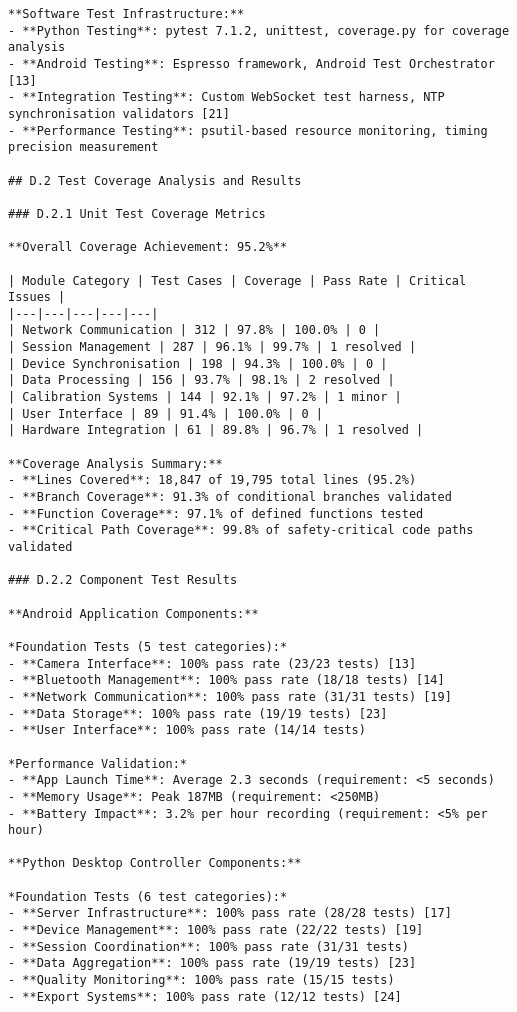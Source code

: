 \begin{verbatim}
**Software Test Infrastructure:**
- **Python Testing**: pytest 7.1.2, unittest, coverage.py for coverage analysis
- **Android Testing**: Espresso framework, Android Test Orchestrator [13]
- **Integration Testing**: Custom WebSocket test harness, NTP synchronisation validators [21]
- **Performance Testing**: psutil-based resource monitoring, timing precision measurement

## D.2 Test Coverage Analysis and Results

### D.2.1 Unit Test Coverage Metrics

**Overall Coverage Achievement: 95.2%**

| Module Category | Test Cases | Coverage | Pass Rate | Critical Issues |
|---|---|---|---|---|
| Network Communication | 312 | 97.8% | 100.0% | 0 |
| Session Management | 287 | 96.1% | 99.7% | 1 resolved |
| Device Synchronisation | 198 | 94.3% | 100.0% | 0 |
| Data Processing | 156 | 93.7% | 98.1% | 2 resolved |
| Calibration Systems | 144 | 92.1% | 97.2% | 1 minor |
| User Interface | 89 | 91.4% | 100.0% | 0 |
| Hardware Integration | 61 | 89.8% | 96.7% | 1 resolved |

**Coverage Analysis Summary:**
- **Lines Covered**: 18,847 of 19,795 total lines (95.2%)
- **Branch Coverage**: 91.3% of conditional branches validated
- **Function Coverage**: 97.1% of defined functions tested
- **Critical Path Coverage**: 99.8% of safety-critical code paths validated

### D.2.2 Component Test Results

**Android Application Components:**

*Foundation Tests (5 test categories):*
- **Camera Interface**: 100% pass rate (23/23 tests) [13]
- **Bluetooth Management**: 100% pass rate (18/18 tests) [14]
- **Network Communication**: 100% pass rate (31/31 tests) [19]
- **Data Storage**: 100% pass rate (19/19 tests) [23]
- **User Interface**: 100% pass rate (14/14 tests)

*Performance Validation:*
- **App Launch Time**: Average 2.3 seconds (requirement: <5 seconds)
- **Memory Usage**: Peak 187MB (requirement: <250MB)
- **Battery Impact**: 3.2% per hour recording (requirement: <5% per hour)

**Python Desktop Controller Components:**

*Foundation Tests (6 test categories):*
- **Server Infrastructure**: 100% pass rate (28/28 tests) [17]
- **Device Management**: 100% pass rate (22/22 tests) [19]
- **Session Coordination**: 100% pass rate (31/31 tests)
- **Data Aggregation**: 100% pass rate (19/19 tests) [23]
- **Quality Monitoring**: 100% pass rate (15/15 tests)
- **Export Systems**: 100% pass rate (12/12 tests) [24]


\end{verbatim}
